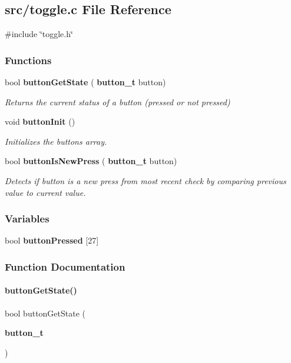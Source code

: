 \subsection{src/toggle.c File Reference}
\label{toggle_8c}
{\ttfamily \#include \char`\"{}toggle.\+h\char`\"{}}\newline
\subsubsection*{Functions}
\begin{DoxyCompactItemize}
\item 
bool \textbf{ button\+Get\+State} (\textbf{ button\+\_\+t} button)
\begin{DoxyCompactList}\small\item\em Returns the current status of a button (pressed or not pressed) \end{DoxyCompactList}\item 
void \textbf{ button\+Init} ()
\begin{DoxyCompactList}\small\item\em Initializes the buttons array. \end{DoxyCompactList}\item 
bool \textbf{ button\+Is\+New\+Press} (\textbf{ button\+\_\+t} button)
\begin{DoxyCompactList}\small\item\em Detects if button is a new press from most recent check by comparing previous value to current value. \end{DoxyCompactList}\end{DoxyCompactItemize}
\subsubsection*{Variables}
\begin{DoxyCompactItemize}
\item 
bool \textbf{ button\+Pressed} [27]
\end{DoxyCompactItemize}


\subsubsection{Function Documentation}
\mbox{\label{toggle_8c_ad2b7c969a01f85d57bdca0bc7f5cff81}} 
\paragraph{button\+Get\+State()}
{\footnotesize\ttfamily bool button\+Get\+State (\begin{DoxyParamCaption}\item[{\textbf{ button\+\_\+t}}]{ }\end{DoxyParamCaption})}



